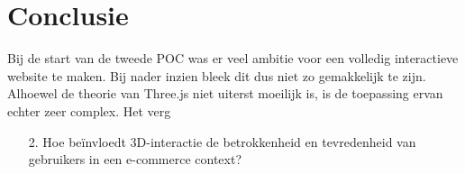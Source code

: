 
\chapter{Conclusie}%
\label{ch:conclusie}



Bij de start van de tweede POC was er veel ambitie voor een volledig interactieve website te maken. Bij nader inzien bleek dit dus niet zo gemakkelijk te zijn. Alhoewel de theorie van Three.js niet uiterst moeilijk is, is de toepassing ervan echter zeer complex. Het verg

\begin{itemize}
	\item[2.] Hoe beïnvloedt 3D-interactie de betrokkenheid en tevredenheid van gebruikers in een e-commerce context?
\end{itemize}